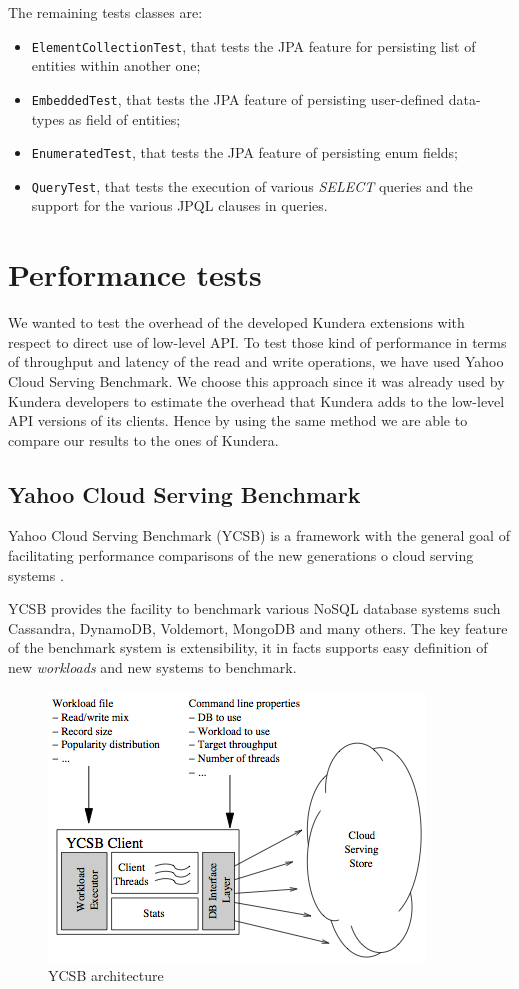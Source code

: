 \newparagraph The remaining tests classes are:
\begin{itemize}
\item \texttt{ElementCollectionTest}, that tests the JPA feature for persisting list of entities within another one;
\item \texttt{EmbeddedTest}, that tests the JPA feature of persisting user-defined data-types as field of entities;
\item \texttt{EnumeratedTest}, that tests the JPA feature of persisting enum fields;
\item \texttt{QueryTest}, that tests the execution of various \textit{SELECT} queries and the support for the various JPQL clauses in queries.
\end{itemize}

\section{Performance tests}
\label{sec:performance}
We wanted to test the overhead of the developed Kundera extensions with respect to direct use of low-level API. To test those kind of performance in terms of throughput and latency of the read and write operations, we have used Yahoo Cloud Serving Benchmark.
We choose this approach since it was already used by Kundera developers to estimate the overhead that Kundera adds to the low-level API versions of its clients. Hence by using the same method we are able to compare our results to the ones of Kundera.

\subsection{Yahoo Cloud Serving Benchmark}
Yahoo Cloud Serving Benchmark (YCSB) is a framework with the general goal of facilitating performance comparisons of the new generations o cloud serving systems \cite{paper:ycsb}.

\noindent YCSB provides the facility to benchmark various NoSQL database systems such Cassandra, DynamoDB, Voldemort, MongoDB and many others.
The key feature of the benchmark system is extensibility, it in facts supports easy definition of new \textit{workloads} and new systems to benchmark.

\begin{figure}[tbh]
  \centering
  \includegraphics[width=10cm]{images/ycsb_architecture}
  \caption{YCSB architecture \cite{paper:ycsb}}
  \label{fig:ycsb-architecture}
\end{figure} 

